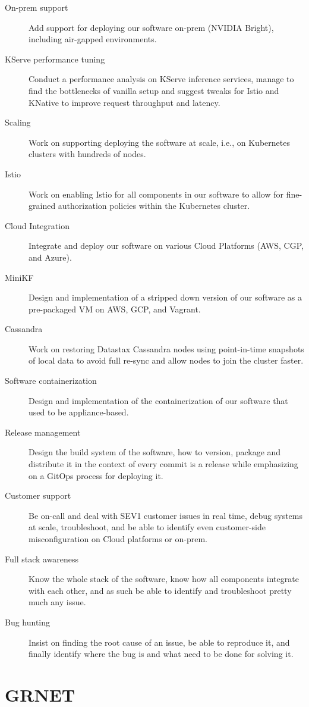 \documentclass[margin,centered]{res}
\begin{document}
\begin{resume}
\begin{description}
\item[On-prem support]
Add support for deploying our software on-prem (NVIDIA Bright), including
air-gapped environments.
\item[KServe performance tuning]
Conduct a performance analysis on KServe inference services, manage to find the
bottlenecks of vanilla setup and suggest tweaks for Istio and KNative to
improve request throughput and latency.
\item[Scaling]
Work on supporting deploying the software at scale, i.e., on Kubernetes
clusters with hundreds of nodes.
\item[Istio]
Work on enabling Istio for all components in our software to allow for
fine-grained authorization policies within the Kubernetes cluster.
\item[Cloud Integration]
Integrate and deploy our software on various Cloud Platforms (AWS, CGP, and
Azure).
\item[MiniKF]
Design and implementation of a stripped down version of our software as a
pre-packaged VM on AWS, GCP, and Vagrant.
\item[Cassandra]
Work on restoring Datastax Cassandra nodes using point-in-time snapshots
of local data to avoid full re-sync and allow nodes to join the cluster faster.
\item[Software containerization]
Design and implementation of the containerization of our software
that used to be appliance-based.
\item[Release management]
Design the build system of the software, how to version, package and distribute
it in the context of every commit is a release while emphasizing on a GitOps
process for deploying it.
\item[Customer support]
Be on-call and deal with SEV1 customer issues in real time, debug systems at
scale, troubleshoot, and be able to identify even customer-side
misconfiguration on Cloud platforms or on-prem.
\item[Full stack awareness]
Know the whole stack of the software, know how all components integrate with
each other, and as such be able to identify and troubleshoot pretty much any
issue.
\item[Bug hunting]
Insist on finding the root cause of an issue, be able to reproduce it, and
finally identify where the bug is and what need to be done for solving it.
\end{description}


\section{\sc GRNET}


\end{resume}
\end{document}
